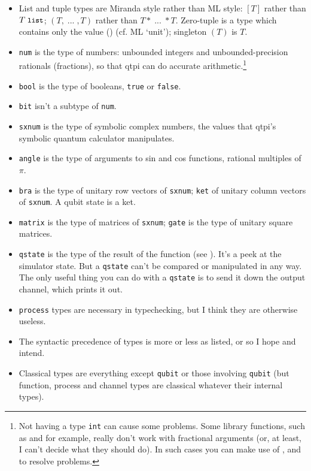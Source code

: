 \documentclass[11pt,a4paper]{book}
\newcommand{\verbtt}[1]{\texttt{\small{}#1}}
\begin{document}
\begin{itemize}
\item List and tuple types are Miranda style rather than ML style: $[T]$ rather than $T\;\verbtt{list}$; $(T,\;...\;,T)$ rather than $T*\;...\;*T$. Zero-tuple is a type which contains only the value () (cf. ML `unit'); singleton $(T)$ is $T$.
\item \verbtt{num} is the type of numbers: unbounded integers and unbounded-precision rationals (fractions), so that qtpi can do accurate arithmetic.\footnote{Not having a type \verbtt{int} can cause some problems. Some library functions, such as  and  for example, really don't work with fractional arguments (or, at least, I can't decide what they should do). In such cases you can make use of ,  and  to resolve problems.}
\item \verbtt{bool} is the type of booleans, \verbtt{true} or \verbtt{false}.
\item \verbtt{bit} isn't a subtype of \verbtt{num}.
\item \verbtt{sxnum} is the type of symbolic complex numbers, the values that qtpi's symbolic quantum calculator manipulates.
\item \verbtt{angle} is the type of arguments to sin and cos functions, rational multiples of $\pi$.
\item \verbtt{bra} is the type of unitary row vectors of \verbtt{sxnum}; \verbtt{ket} of unitary column vectors of \verbtt{sxnum}. A qubit state is a ket.
\item \verbtt{matrix}  is the type of matrices of \verbtt{sxnum}; \verbtt{gate} is the type of unitary square matrices.
\item \verbtt{qstate}  is the type of the result of the   function (see ). It's a peek at the simulator state. But a \verbtt{qstate} can't be compared or manipulated in any way. The only useful thing you can do with a \verbtt{qstate}  is to send it down the  output channel, which prints it out.
\item \verbtt{process} types are necessary in typechecking, but I think they are otherwise useless.
\item The syntactic precedence of types is more or less as listed, or so I hope and intend. 
\item Classical types are everything except \verbtt{qubit}  or those involving \verbtt{qubit}  (but function, process and channel types are classical whatever their internal types).  

\end{itemize}
\end{document}
